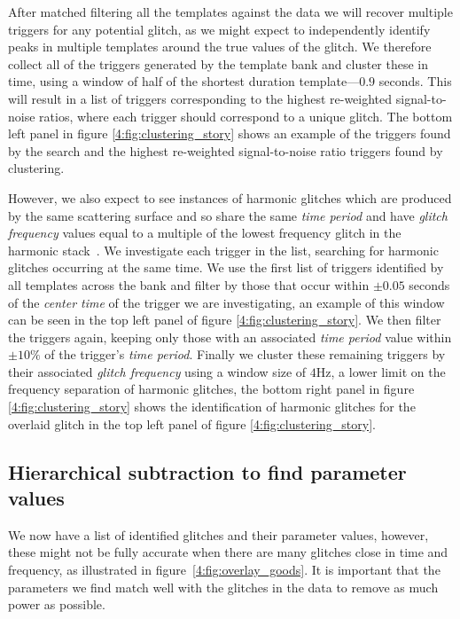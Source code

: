 After matched filtering all the templates against the data we will recover multiple triggers for any potential \scl{} glitch, as we might expect to independently identify peaks in multiple templates around the true values of the glitch. We therefore collect all of the triggers generated by the template bank and cluster these in time, using a window of half of the shortest duration template---$0.9$ seconds. This will result in a list of triggers corresponding to the highest re-weighted signal-to-noise ratios, where each trigger should correspond to a unique \scl{} glitch. The bottom left panel in figure \ref{4:fig:clustering_story} shows an example of the triggers found by the search and the highest re-weighted signal-to-noise ratio triggers found by clustering.

However, we also expect to see instances of harmonic glitches which are produced by the same scattering surface and so share the same \emph{time period} and have \emph{glitch frequency} values equal to a multiple of the lowest frequency glitch in the harmonic stack~\cite{TAccadia:2010}. We investigate each trigger in the list, searching for harmonic glitches occurring at the same time. We use the first list of triggers identified by all templates across the bank and filter by those that occur within $\pm0.05$ seconds of the \emph{center time} of the trigger we are investigating, an example of this window can be seen in the top left panel of figure \ref{4:fig:clustering_story}. We then filter the triggers again, keeping only those with an associated \emph{time period} value within $\pm 10 \%$ of the trigger's \emph{time period}. Finally we cluster these remaining triggers by their associated \emph{glitch frequency} using a window size of $4$Hz, a lower limit on the frequency separation of harmonic glitches, the bottom right panel in figure \ref{4:fig:clustering_story} shows the identification of harmonic glitches for the overlaid \scl{} glitch in the top left panel of figure \ref{4:fig:clustering_story}.

\subsection{Hierarchical subtraction to find parameter values}

We now have a list of identified \scl{} glitches and their parameter values, however, these might not be fully accurate when there are many glitches close in time and frequency, as illustrated in figure~\ref{4:fig:overlay_goods}. It is important that the parameters we find match well with the glitches in the data to remove as much power as possible.

